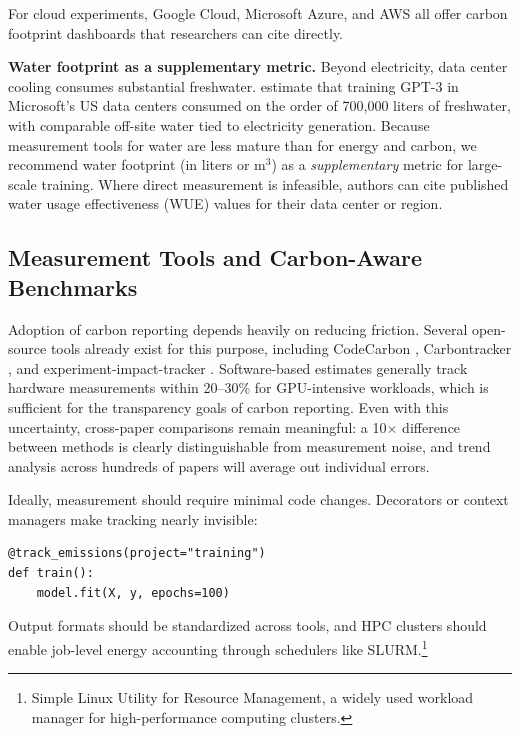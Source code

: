 \documentclass{article}
\theoremstyle{plain}
\theoremstyle{definition}
\theoremstyle{remark}
\begin{document}
For cloud experiments, Google Cloud, Microsoft Azure, and AWS all offer carbon footprint dashboards that researchers can cite directly.

\textbf{Water footprint as a supplementary metric.} Beyond electricity, data center cooling consumes substantial freshwater. \citet{li2023water} estimate that training GPT-3 in Microsoft's US data centers consumed on the order of 700{,}000 liters of freshwater, with comparable off-site water tied to electricity generation. Because measurement tools for water are less mature than for energy and carbon, we recommend water footprint (in liters or m$^3$) as a \emph{supplementary} metric for large-scale training. Where direct measurement is infeasible, authors can cite published water usage effectiveness (WUE) values for their data center or region.

\subsection{Measurement Tools and Carbon-Aware Benchmarks}
\label{sec:tools-benchmarks}

Adoption of carbon reporting depends heavily on reducing friction. Several open-source tools already exist for this purpose, including CodeCarbon \cite{codecarbon2020}, Carbontracker \cite{anthony2020carbontracker}, and experiment-impact-tracker \cite{henderson2020towards}. Software-based estimates generally track hardware measurements within 20--30\% for GPU-intensive workloads, which is sufficient for the transparency goals of carbon reporting. Even with this uncertainty, cross-paper comparisons remain meaningful: a 10$\times$ difference between methods is clearly distinguishable from measurement noise, and trend analysis across hundreds of papers will average out individual errors.

Ideally, measurement should require minimal code changes. Decorators or context managers make tracking nearly invisible:

\begin{verbatim}
@track_emissions(project="training")
def train():
    model.fit(X, y, epochs=100)
\end{verbatim}

Output formats should be standardized across tools, and HPC clusters should enable job-level energy accounting through schedulers like SLURM.\footnote{Simple Linux Utility for Resource Management, a widely used workload manager for high-performance computing clusters.}
\end{document}
